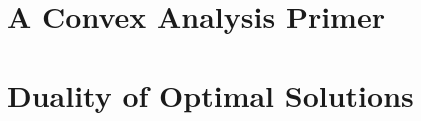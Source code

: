 \documentclass[11pt, a4paper, BCOR=7mm, DIV=11, headinclude=true]{scrbook}
\theoremstyle{definition}
\theoremstyle{plain}
\begin{document}
\section{A Convex Analysis Primer}
  
\section{Duality of Optimal Solutions}
  

\renewcommand{\bibsection}
{
\chapter*{References}
\addcontentsline{toc}{chapter}{References}
}


\printindex
\end{document}
